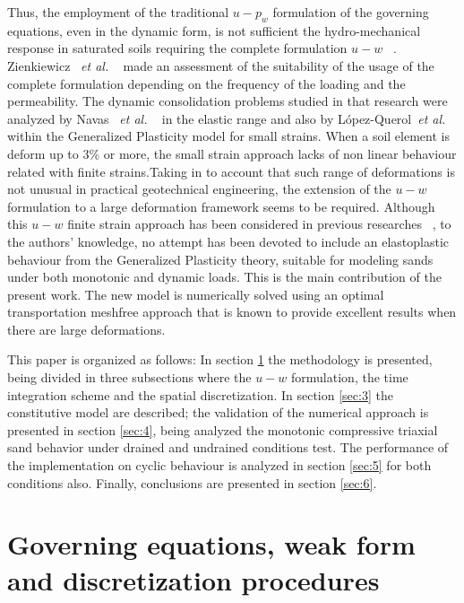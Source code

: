 \documentclass[preprint,12pt,a4paper]{elsarticle}
\begin{document}
Thus, the employment of the traditional $u-p_w$ formulation of the governing equations, even in the dynamic form, is not sufficient  the hydro-mechanical response in saturated soils requiring the complete formulation $u-w$ ~\cite{zienkiewicz1984}. Zienkiewicz ~\textit{et al.} ~\cite{zienkiewicz1980} made an assessment of the suitability of the usage of the complete formulation depending on the frequency of the loading and the permeability. The dynamic consolidation problems studied in that research were analyzed by Navas ~\textit{et al.} ~\cite{Navas2016b} in the elastic range and also by L\'opez-Querol~\textit{et al.} ~\cite{LopezQuerol2006} within the Generalized Plasticity model for small strains. When a soil element is deform up to $3\%$ or more, the small strain approach lacks of non linear behaviour related with finite strains.Taking in to account that such range of deformations is not unusual in practical geotechnical engineering, the extension of the $u-w$ formulation to a large deformation framework seems to be required.
Although this $u-w$ finite strain approach has been considered in previous researches ~\cite{Navas2016}, to the authors' knowledge, no attempt has been devoted to include an elastoplastic behaviour from the Generalized Plasticity theory, suitable for modeling sands under both monotonic and dynamic loads. This is the main contribution of the present work. The new model is numerically solved using an optimal transportation meshfree approach that is known to provide excellent results when there are large deformations.


This paper is organized as follows:  In section \ref{sec:2} the methodology is presented, being divided in three subsections where the $u-w$ formulation, the time integration scheme and the spatial discretization. In section \ref{sec:3} the constitutive model are described; the validation of the numerical approach is presented in section \ref{sec:4}, being analyzed the monotonic compressive triaxial sand behavior under drained and undrained conditions test. The performance of the implementation on cyclic behaviour is analyzed in section \ref{sec:5} for both conditions also. Finally, conclusions are presented in section \ref{sec:6}.

\section{Governing equations, weak form and discretization procedures}\label{sec:2}
\end{document}
